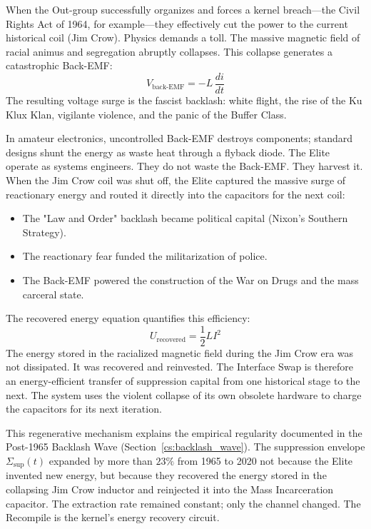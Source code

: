 When the Out-group successfully organizes and forces a kernel breach---the Civil Rights Act of 1964, for example---they effectively cut the power to the current historical coil (Jim Crow). Physics demands a toll. The massive magnetic field of racial animus and segregation abruptly collapses. This collapse generates a catastrophic Back-EMF:
\begin{equation}\label{eq:1.7d-back-emf}
V_{\text{back-EMF}} = -L\,\frac{di}{dt}
\end{equation}
The resulting voltage surge is the fascist backlash: white flight, the rise of the Ku Klux Klan, vigilante violence, and the panic of the Buffer Class.

In amateur electronics, uncontrolled Back-EMF destroys components; standard designs shunt the energy as waste heat through a flyback diode. The Elite operate as systems engineers. They do not waste the Back-EMF. They harvest it. When the Jim Crow coil was shut off, the Elite captured the massive surge of reactionary energy and routed it directly into the capacitors for the next coil:
\begin{itemize}
    \item The "Law and Order" backlash became political capital (Nixon's Southern Strategy).
    \item The reactionary fear funded the militarization of police.
    \item The Back-EMF powered the construction of the War on Drugs and the mass carceral state.
\end{itemize}

The recovered energy equation quantifies this efficiency:
\begin{equation}\label{eq:1.7e-energy-recovery}
U_{\text{recovered}} = \frac{1}{2}LI^2
\end{equation}
The energy stored in the racialized magnetic field during the Jim Crow era was not dissipated. It was recovered and reinvested. The Interface Swap is therefore an energy-efficient transfer of suppression capital from one historical stage to the next. The system uses the violent collapse of its own obsolete hardware to charge the capacitors for its next iteration.

This regenerative mechanism explains the empirical regularity documented in the Post-1965 Backlash Wave (Section~\ref{cs:backlash_wave}). The suppression envelope $\Sigma_{\text{sup}}(t)$ expanded by more than $23\%$ from 1965 to 2020 not because the Elite invented new energy, but because they recovered the energy stored in the collapsing Jim Crow inductor and reinjected it into the Mass Incarceration capacitor. The extraction rate remained constant; only the channel changed. The Recompile is the kernel's energy recovery circuit.

